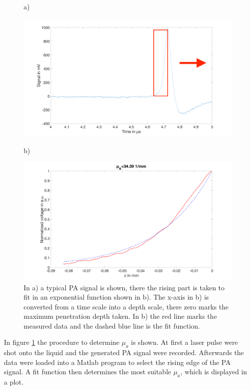 \begin{figure}[H]
	a)
	\begin{minipage}{0.5\textwidth}		
		\includegraphics[width = \textwidth, height=0.25\textheight]{03_GR-PAM_theory/images/mu_aSig.png}
	\end{minipage}
	b)
	\begin{minipage}{0.5\textwidth}		
		\includegraphics[width = \textwidth, height=0.25\textheight]{03_GR-PAM_theory/images/mu_aFit.png}
	\end{minipage}	
	\caption{In a) a typical PA signal is shown, there the rising part is taken to fit in an exponential function shown in b). The x-axis in b) is converted from a time scale into a depth scale, there zero marks the maximum penetration depth taken. In b) the red line marks the measured data and the dashed blue line is the fit function.}
	\label{fig:mu_aSigFit}
\end{figure}

In figure \ref{fig:mu_aSigFit} the procedure to determine $\mu_a$ is shown. At first a laser pulse were shot onto the liquid and the generated PA signal were recorded. Afterwards the data were loaded into a Matlab program to select the rising edge of the PA signal. A fit function then determines the most suitable $\mu_a$, which is displayed in a plot. 

